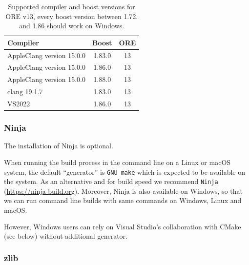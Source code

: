 \begin{table}[hbt]
 \begin{tabular}{|l|c|c|}
   \hline
   Compiler & Boost & ORE \\
   \hline
    AppleClang version 15.0.0 & 1.83.0 & 13\\
    AppleClang version 15.0.0 & 1.86.0 & 13\\
    AppleClang version 15.0.0 & 1.88.0 & 13\\
    clang 19.1.7 & 1.83.0 & 13 \\
    VS2022 & 1.86.0 & 13 \\
    \hline
  \end{tabular}
  \caption{Supported compiler and boost versions for ORE v13, every boost version between 1.72. and 1.86 should work on Windows.}
  \label{tab:compiler_boost_versions}
\end{table}

\subsubsection*{Ninja}

The installation of Ninja is optional.

When running the build process in the command line on a Linux or macOS system, the default ``generator'' is {\tt GNU make} which is
expected to be available on the system. As an alternative and for build speed we recommend {\tt Ninja} (\url{https://ninja-build.org}).
Moreover, Ninja is also available on Windows, so that we can run command line builds with same commands on Windows, Linux and macOS.

However, Windows users can rely on Visual Studio's collaboration with CMake (see below) without additional generator.

\subsubsection*{zlib}

